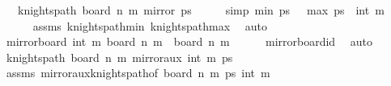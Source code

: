 \begin{isabellebody}
\ \ \ {\isachardoublequoteopen}knights{\isacharunderscore}{\kern0pt}path\ {\isacharparenleft}{\kern0pt}board\ n\ m{\isacharparenright}{\kern0pt}\ {\isacharparenleft}{\kern0pt}mirror{}\ ps{\isacharparenright}{\kern0pt}{\isachardoublequoteclose}\isanewline
%
\isadelimproof
%
\endisadelimproof
%
\isatagproof
{}\isamarkupfalse%
\ {\isacharminus}{\kern0pt}\isanewline
\ \ \isamarkupfalse%
\ {\isacharbrackleft}{\kern0pt}simp{\isacharbrackright}{\kern0pt}{\isacharcolon}{\kern0pt}\ {\isachardoublequoteopen}min{}\ ps\ {\isacharequal}{\kern0pt}\ {}{\isachardoublequoteclose}\ {\isachardoublequoteopen}max{}\ ps\ {\isacharequal}{\kern0pt}\ int\ m{\isachardoublequoteclose}\isanewline
\ \ \ \ \isamarkupfalse%
\ assms\ knights{\isacharunderscore}{\kern0pt}path{\isacharunderscore}{\kern0pt}min{}\ knights{\isacharunderscore}{\kern0pt}path{\isacharunderscore}{\kern0pt}max{}\ \isamarkupfalse%
\ auto\isanewline
\ \ \isamarkupfalse%
\ \isamarkupfalse%
\ {\isachardoublequoteopen}mirror{}{\isacharunderscore}{\kern0pt}board\ {\isacharparenleft}{\kern0pt}int\ m{\isacharplus}{\kern0pt}{}{\isacharparenright}{\kern0pt}\ {\isacharparenleft}{\kern0pt}board\ n\ m{\isacharparenright}{\kern0pt}\ {\isacharequal}{\kern0pt}\ {\isacharparenleft}{\kern0pt}board\ n\ m{\isacharparenright}{\kern0pt}{\isachardoublequoteclose}\isanewline
\ \ \ \ \isamarkupfalse%
\ mirror{}{\isacharunderscore}{\kern0pt}board{\isacharunderscore}{\kern0pt}id\ \isamarkupfalse%
\ auto\isanewline
\ \ \isamarkupfalse%
\ \isamarkupfalse%
\ {\isachardoublequoteopen}knights{\isacharunderscore}{\kern0pt}path\ {\isacharparenleft}{\kern0pt}board\ n\ m{\isacharparenright}{\kern0pt}\ {\isacharparenleft}{\kern0pt}mirror{}{\isacharunderscore}{\kern0pt}aux\ {\isacharparenleft}{\kern0pt}int\ m{\isacharplus}{\kern0pt}{}{\isacharparenright}{\kern0pt}\ ps{\isacharparenright}{\kern0pt}{\isachardoublequoteclose}\isanewline
\ \ \ \ \isamarkupfalse%
\ assms\ mirror{}{\isacharunderscore}{\kern0pt}aux{\isacharunderscore}{\kern0pt}knights{\isacharunderscore}{\kern0pt}path{\isacharbrackleft}{\kern0pt}of\ {\isachardoublequoteopen}board\ n\ m{\isachardoublequoteclose}\ ps\ {\isachardoublequoteopen}int\ m{\isacharplus}{\kern0pt}{}{\isachardoublequoteclose}{\isacharbrackright}{\kern0pt}\ \isamarkupfalse%

\end{isabellebody}
